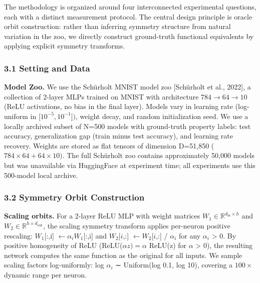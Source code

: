 
The methodology is organized around four interconnected experimental questions, each with a distinct measurement protocol. The central design principle is oracle orbit construction: rather than inferring symmetry structure from natural variation in the zoo, we directly construct ground-truth functional equivalents by applying explicit symmetry transforms.

\subsubsection{3.1 Setting and Data}

\textbf{Model Zoo.} We use the Schürholt MNIST model zoo [Schürholt et al., 2022], a collection of 2-layer MLPs trained on MNIST with architecture $784\rightarrow 64\rightarrow 10$ (ReLU activations, no bias in the final layer). Models vary in learning rate (log-uniform in [$10^{-5}, 10^{-1}])$, weight decay, and random initialization seed. We use a locally archived subset of N=500 models with ground-truth property labels: test accuracy, generalization gap (train minus test accuracy), and learning rate recovery. Weights are stored as flat tensors of dimension D=51,850 ($784\times 64 + 64\times 10)$. The full Schürholt zoo contains approximately 50,000 models but was unavailable via HuggingFace at experiment time; all experiments use this 500-model local archive.

\subsubsection{3.2 Symmetry Orbit Construction}

\textbf{Scaling orbits.} For a 2-layer ReLU MLP with weight matrices $W_1 \in \mathbb{R}^{d_{\mathrm{in}} \times h}$ and $W_2 \in \mathbb{R}^{h \times d_{\mathrm{out}}}$, the scaling symmetry transform applies per-neuron positive rescaling: $W_{1}[$:,i] $\leftarrow \alpha _i W_{1}[$:,i] and $W_{2}[i$,:] $\leftarrow W_{2}[i$,:] / $\alpha _i$ for any $\alpha _i$ > 0. By positive homogeneity of ReLU (ReLU($\alpha z) = \alpha$ ReLU(z) for $\alpha$ > 0), the resulting network computes the same function as the original for all inputs. We sample scaling factors log-uniformly: log $\alpha _i$ ∼ Uniform(log 0.1, log 10), covering a $100\times$ dynamic range per neuron.

